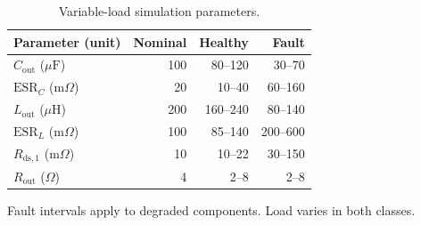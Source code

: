 \begin{table}[!t]
\centering
\caption{Variable-load simulation parameters.}
\label{tab:converter_parameters}
\footnotesize
\setlength{\tabcolsep}{4pt}
\begin{tabular*}{\columnwidth}{@{\extracolsep{\fill}}lrrr@{}}
\toprule
Parameter (unit) & Nominal & Healthy & Fault \\
\midrule
$C_{\mathrm{out}}$ ($\mu\mathrm{F}$) & 100 & 80--120 & 30--70 \\
$\mathrm{ESR}_C$ ($\mathrm{m}\Omega$) & 20 & 10--40 & 60--160 \\
$L_{\mathrm{out}}$ ($\mu\mathrm{H}$) & 200 & 160--240 & 80--140 \\
$\mathrm{ESR}_L$ ($\mathrm{m}\Omega$) & 100 & 85--140 & 200--600 \\
$R_{\mathrm{ds},1}$ ($\mathrm{m}\Omega$) & 10 & 10--22 & 30--150 \\
$R_{\mathrm{out}}$ ($\Omega$) & 4 & 2--8 & 2--8 \\
\bottomrule
\end{tabular*}
\par\smallskip\parbox{\columnwidth}{Fault intervals apply to degraded components. Load varies in both classes.}
\end{table}
